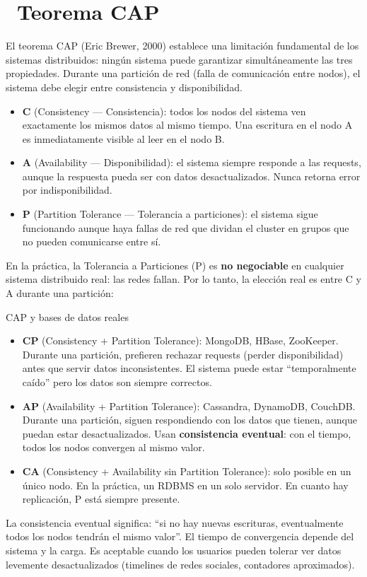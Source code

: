 \section[Teorema CAP]{~Teorema CAP}

El teorema CAP (Eric Brewer, 2000) establece una limitación fundamental de los sistemas distribuidos: ningún sistema puede garantizar simultáneamente las tres propiedades. Durante una partición de red (falla de comunicación entre nodos), el sistema debe elegir entre consistencia y disponibilidad.

\begin{itemize}
  \item \textbf{C} (Consistency — Consistencia): todos los nodos del sistema ven exactamente los mismos datos al mismo tiempo. Una escritura en el nodo A es inmediatamente visible al leer en el nodo B.
  \item \textbf{A} (Availability — Disponibilidad): el sistema siempre responde a las requests, aunque la respuesta pueda ser con datos desactualizados. Nunca retorna error por indisponibilidad.
  \item \textbf{P} (Partition Tolerance — Tolerancia a particiones): el sistema sigue funcionando aunque haya fallas de red que dividan el cluster en grupos que no pueden comunicarse entre sí.
\end{itemize}

En la práctica, la Tolerancia a Particiones (P) es \textbf{no negociable} en cualquier sistema distribuido real: las redes fallan.
Por lo tanto, la elección real es entre C y A durante una partición:

\begin{tipbox}{CAP y bases de datos reales}
\begin{itemize}
  \item \textbf{CP} (Consistency + Partition Tolerance): MongoDB, HBase, ZooKeeper. Durante una partición, prefieren rechazar requests (perder disponibilidad) antes que servir datos inconsistentes. El sistema puede estar ``temporalmente caído'' pero los datos son siempre correctos.
  \item \textbf{AP} (Availability + Partition Tolerance): Cassandra, DynamoDB, CouchDB. Durante una partición, siguen respondiendo con los datos que tienen, aunque puedan estar desactualizados. Usan \textbf{consistencia eventual}: con el tiempo, todos los nodos convergen al mismo valor.
  \item \textbf{CA} (Consistency + Availability sin Partition Tolerance): solo posible en un único nodo. En la práctica, un RDBMS en un solo servidor. En cuanto hay replicación, P está siempre presente.
\end{itemize}
La consistencia eventual significa: ``si no hay nuevas escrituras, eventualmente todos los nodos tendrán el mismo valor''. El tiempo de convergencia depende del sistema y la carga. Es aceptable cuando los usuarios pueden tolerar ver datos levemente desactualizados (timelines de redes sociales, contadores aproximados).
\end{tipbox}

